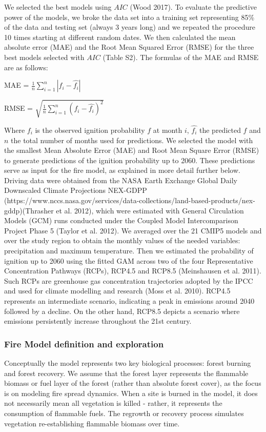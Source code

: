 \documentclass[
]{article}
\begin{document}
We selected the best models using \(AIC\) (Wood 2017). To evaluate the
predictive power of the models, we broke the data set into a training
set representing 85\% of the data and testing set (always 3 years long)
and we repeated the procedure 10 times starting at different random
dates. We then calculated the mean absolute error (MAE) and the Root
Mean Squared Error (RMSE) for the three best models selected with
\(AIC\) (Table S2). The formulas of the MAE and RMSE are as follows:

MAE = \(\frac{1}{n} \sum_{i=1}^n |f_i - \hat{f_i}|\)

RMSE = \(\sqrt{\frac{1}{n} \sum_{i=1}^n (f_i - \hat{f_i})^2}\)

Where \(f_i\) is the observed ignition probability \(f\) at month \(i\),
\(\hat{f_i}\) the predicted \(f\) and \(n\) the total number of months
used for predictions. We selected the model with the smallest Mean
Absolute Error (MAE) and Root Mean Square Error (RMSE) to generate
predictions of the ignition probability up to 2060. These predictions
serve as input for the fire model, as explained in more detail further
below. Driving data were obtained from the NASA Earth Exchange Global
Daily Downscaled Climate Projections NEX-GDPP
(https://www.nccs.nasa.gov/services/data-collections/land-based-products/nex-gddp)(Thrasher
et al. 2012), which were estimated with General Circulation Models (GCM)
runs conducted under the Coupled Model Intercomparison Project Phase 5
(Taylor et al. 2012). We averaged over the 21 CMIP5 models and over the
study region to obtain the monthly values of the needed variables:
precipitation and maximum temperature. Then we estimated the probability
of ignition up to 2060 using the fitted GAM across two of the four
Representative Concentration Pathways (RCPs), RCP4.5 and RCP8.5
(Meinshausen et al. 2011). Such RCPs are greenhouse gas concentration
trajectories adopted by the IPCC and used for climate modelling and
research (Moss et al. 2010). RCP4.5 represents an intermediate scenario,
indicating a peak in emissions around 2040 followed by a decline. On the
other hand, RCP8.5 depicts a scenario where emissions persistently
increase throughout the 21st century.

\subsubsection{Fire Model definition and
exploration}\label{fire-model-definition-and-exploration}

Conceptually the model represents two key biological processes: forest
burning and forest recovery. We assume that the forest layer represents
the flammable biomass or fuel layer of the forest (rather than absolute
forest cover), as the focus is on modeling fire spread dynamics. When a
site is burned in the model, it does not necessarily mean all vegetation
is killed - rather, it represents the consumption of flammable fuels.
The regrowth or recovery process simulates vegetation re-establishing
flammable biomass over time.
\end{document}
